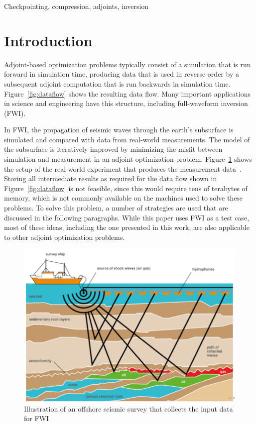 \documentclass[conference]{IEEEtran}
\begin{document}
\begin{IEEEkeywords}
Checkpointing, compression, adjoints, inversion
\end{IEEEkeywords}

\section{Introduction}
Adjoint-based optimization problems typically consist of a simulation that is
run forward in simulation time, producing data that is used in reverse order by
a subsequent adjoint computation that is run backwards in simulation time.
Figure~\ref{fig:dataflow} shows the resulting data flow. Many important
applications in science and engineering have this structure, including
full-waveform inversion (FWI).

In FWI, the propagation of seismic waves through the earth's subsurface is
simulated and compared with data from real-world measurements. The model of the
subsurface is iteratively improved by minimizing the misfit between simulation and
measurement in an adjoint optimization problem.
Figure~\ref{fig:offshore_survey} shows the setup of the real-world experiment that
produces the measurement data~\cite{plessix2006review}. Storing all intermediate
results as required for the data flow shown in Figure~\ref{fig:dataflow} is not
feasible, since this would require tens of terabytes of memory, which is not
commonly available on the machines used to solve these problems. To solve this
problem, a number of strategies are used that are discussed in the following
paragraphs. While this paper uses FWI as a test case, most of these ideas,
including the one presented in this work, are also applicable to other adjoint
optimization problems.

\begin{figure}
\begin{center}
\includegraphics[width=0.8\linewidth]{images/survey-ship-diagram.png}
\end{center}
\caption{Illustration of an offshore seismic survey that collects the input data for FWI}
\label{fig:offshore_survey}
\end{figure}
\end{document}
